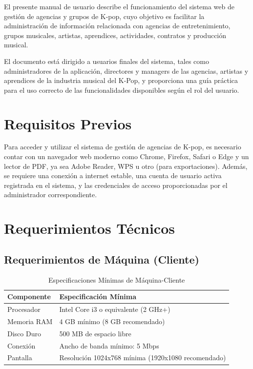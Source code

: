 \documentclass[12pt,a4paper,spanish,oneside]{article}
\begin{document}
	El presente manual de usuario describe el funcionamiento del sistema web de gestión
	de agencias y grupos de K-pop, cuyo objetivo es facilitar la administración de información relacionada con agencias de entretenimiento, grupos musicales, artistas, aprendices, actividades, contratos y producción musical.
	
	\vspace{0.3cm}
	
	El documento está dirigido a usuarios finales del sistema, tales como administradores de la aplicación,
	directores y managers de las agencias, artistas y aprendices de la industria musical del K-Pop, y proporciona una guía práctica
	para el uso correcto de las funcionalidades disponibles según el rol del usuario.
	
	
	\section{Requisitos Previos}
	
	Para acceder y utilizar el sistema de gestión de agencias de K-pop, es necesario contar con un navegador web moderno como Chrome, Firefox, Safari o Edge y un lector de PDF, ya sea Adobe Reader, WPS u otro (para exportaciones). Además, se requiere una conexión a internet estable, una cuenta de usuario activa registrada en el sistema, y las credenciales de acceso proporcionadas por el administrador correspondiente.
	
	\section{Requerimientos Técnicos}
	
	\subsection{Requerimientos de Máquina (Cliente)}
	
	\begin{table}[H]
		\centering
		\caption{Especificaciones Mínimas de Máquina-Cliente}
		\begin{tabular}{|l|l|}
			\hline
			\textbf{Componente} & \textbf{Especificación Mínima} \\
			\hline
			Procesador & Intel Core i3 o equivalente (2 GHz+) \\
			\hline
			Memoria RAM & 4 GB mínimo (8 GB recomendado) \\
			\hline
			Disco Duro & 500 MB de espacio libre \\
			\hline
			Conexión & Ancho de banda mínimo: 5 Mbps \\
			\hline
			Pantalla & Resolución 1024x768 mínima (1920x1080 recomendado) \\
			\hline
		\end{tabular}
	\end{table}
	
\end{document}

